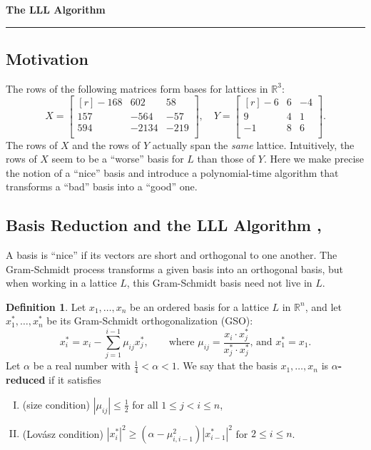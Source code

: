 \documentclass[11pt,letterpaper]{article}
\newcommand{\reals}{\mathbb{R}}
\theoremstyle{definition}
\newtheorem{definition}{Definition}
\begin{document}
\begin{center}
{\bf \Large The LLL Algorithm} %
\vspace{0.2cm}
\hrule
\end{center}
%	
\subsection*{Motivation}
The rows of the following matrices form bases for lattices in $\reals^3$:
\[
X = \begin{bmatrix*}[r]
	-168 & 602 & 58\\
	157 & -564 & -57\\
	594 & -2134 & -219\\
\end{bmatrix*}, \quad
Y = \begin{bmatrix*}[r]
	-6 & 6 & -4\\
	9 & 4 & 1\\
	-1 & 8 & 6\\
\end{bmatrix*}.
\]
The rows of $X$ and the rows of $Y$ actually span the \textit{same} lattice. Intuitively, the rows of $X$ seem to be a ``worse'' basis for $L$ than those of $Y$. Here we make precise the notion of a ``nice'' basis and introduce a polynomial-time algorithm that transforms a ``bad'' basis into a ``good'' one. 

\subsection*{Basis Reduction and the LLL Algorithm \cite{lll82}, \cite{hps14}}
A basis is ``nice'' if its vectors are short and orthogonal to one another. The Gram-Schmidt process transforms a given basis into an orthogonal basis, but when working in a lattice $L$, this Gram-Schmidt basis need not live in $L$.
\begin{definition}
	Let $x_1, \ldots, x_n$ be an ordered basis for a lattice $L$ in $\reals^n$, and let $x_1^*, \ldots, x_n^*$ be its Gram-Schmidt orthogonalization (GSO):
	\begin{equation*}
	x_i^* = x_i - \sum_{j=1}^{i-1}\mu_{ij}x_j^*,\qquad \text{where }\mu_{ij} = \frac{x_i\cdot x_j^*}{x_j^*\cdot x_j^*}\text{, and }x_1^* = x_1.
	\end{equation*}
	Let $\alpha$ be a real number with $\frac{1}{4}<\alpha<1$. We say that the basis $x_1, \ldots, x_n$ is \textbf{$\alpha$-reduced} if it satisfies
	\begin{enumerate}[(I)]
		\item (size condition) $|\mu_{ij}|\leq \frac{1}{2}$ for all $1\leq j<i\leq n$,
		\item (Lov\'asz condition) $|x_i^*|^2\geq (\alpha-\mu_{i,i-1}^2)|x_{i-1}^*|^2$ for $2\leq i\leq n$.
	\end{enumerate}
\end{definition}
\end{document}
